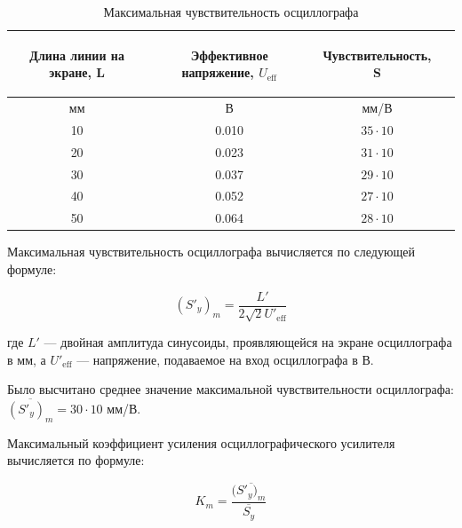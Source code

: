 \begin{center}
\begin{table}[H]
\centering
\caption{Максимальная чувствительность осциллографа}
\label{tabl:3}
\begin{tabular}{|c|c|c|c|}
\hline
\begin{minipage}{5cm}
\begin{center}
    Длина линии на экране, L
\end{center}
\end{minipage} &
\begin{minipage}{5cm}
\begin{center}
    Эффективное напряжение, $U_{\text{eff}}$
\end{center}
\end{minipage} &
\begin{minipage}{5cm}
\begin{center}
    Чувствительность, S
\end{center}
\end{minipage}\\
\hline
мм&В&мм/В\\
\hline
10  &  0.010  &  $35\cdot10$ \\
20  &  0.023  &  $31\cdot10$ \\
30  &  0.037  &  $29\cdot10$ \\
40  &  0.052  &  $27\cdot10$ \\
50  &  0.064  &  $28\cdot10$ \\
\hline
\end{tabular}
\end{table}
\end{center}

Максимальная чувствительность осциллографа вычисляется по следующей формуле:

\begin{equation}
\label{eq:6}
   (S'_y)_m=\frac{L'}{2\sqrt{2}U'_\text{{eff}}}
\end{equation}

где $L'$ — двойная амплитуда синусоиды, проявляющейся на экране осциллографа в мм, а $U'_\text{{eff}}$ — напряжение, подаваемое на вход осциллографа в В.

Было высчитано среднее значение максимальной чувствительности осциллографа: $\overline{(S'_y)_m} = 30\cdot10$ мм/В.

Максимальный коэффициент усиления осциллографического усилителя вычисляется по формуле:

\begin{equation}
\label{eq:7}
   K_m=\frac{(\overline{S'_y)_m}}{\overline{S_y}}
\end{equation}

